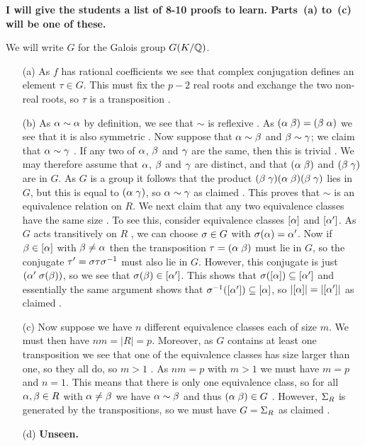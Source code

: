\documentclass[a4paper]{article}
\begin{document}
\begin{solution}
  \textbf{I will give the students a list of 8-10 proofs to
   learn.  Parts~(a) to~(c) will be one of these.}

 We will write $G$ for the Galois group $G(K/{\mathbb{Q}})$.
 \begin{itemize}
  \item[(a)] As $f$ has rational coefficients we see that complex
   conjugation defines an element $\tau\in G$.  This must fix the
   $p-2$ real roots and exchange the two non-real roots, so $\tau$ is
   a transposition . 
  \item[(b)] As $\alpha\sim\alpha$ by definition, we see that $\sim$ is
   reflexive \mk.  As $(\alpha\;\beta)=(\beta\;\alpha)$ we see that it is also
   symmetric \mk.  Now suppose that $\alpha\sim\beta$ and $\beta\sim\gamma$; we
   claim that $\alpha\sim\gamma$ \mk.  If any two of $\alpha$, $\beta$ and $\gamma$
   are the same, then this is trivial \mk.  We may therefore assume that
   $\alpha$, $\beta$ and $\gamma$ are distinct, and that $(\alpha\;\beta)$ and
   $(\beta\;\gamma)$ are in $G$.  As $G$ is a group it follows that the
   product $(\beta\;\gamma)(\alpha\;\beta)(\beta\;\gamma)$ lies in $G$, but this is
   equal to $(\alpha\;\gamma)$, so $\alpha\sim\gamma$ as claimed .  This proves
   that $\sim$ is an equivalence relation on $R$.  We next claim that
   any two equivalence classes have the same size \mk.  To see this,
   consider equivalence classes $[\alpha]$ and $[\alpha']$.  As $G$ acts
   transitively on $R$ \mk, we can choose $\sigma\in G$ with $\sigma(\alpha)=\alpha'$.
   Now if $\beta\in[\alpha]$ with $\beta\neq\alpha$ then the transposition
   $\tau=(\alpha\;\beta)$ must lie in $G$, so the conjugate
   $\tau'=\sigma\tau\sigma^{-1}$ must also lie in $G$.  However, this
   conjugate is just $(\alpha'\;\sigma(\beta))$, so we see that
   $\sigma(\beta)\in[\alpha']$.  This shows that $\sigma([\alpha])\subseteq [\alpha']$ and
   essentially the same argument shows that
   $\sigma^{-1}([\alpha'])\subseteq[\alpha]$, so $|[\alpha]|=|[\alpha']|$ as claimed
   .
  \item[(c)] Now suppose we have $n$ different equivalence classes each
   of size $m$.  We must then have $nm=|R|=p$.  Moreover, as $G$ contains
   at least one transposition we see that one of the equivalence
   classes has size larger than one, so they all do, so $m>1$ \mk.  As
   $nm=p$ with $m>1$ we must have $m=p$ and $n=1$.  This means that
   there is only one equivalence class, so for all $\alpha,\beta\in R$ with
   $\alpha\neq\beta$ we have $\alpha\sim\beta$ and thus $(\alpha\;\beta)\in G$ \mk.
   However, $\Sigma_R$ is generated by the transpositions, so we must
   have $G=\Sigma_R$ as claimed \mk.
  \item[(d)] \textbf{Unseen.}

\end{itemize}
\end{solution}
\end{document}
